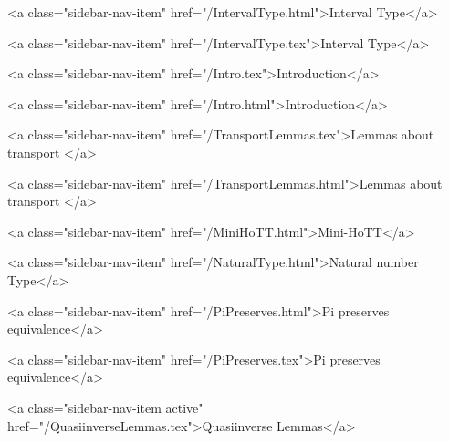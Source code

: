      
        
          <a class="sidebar-nav-item" href="/IntervalType.html">Interval Type</a>
        
      
    
      
        
          <a class="sidebar-nav-item" href="/IntervalType.tex">Interval Type</a>
        
      
    
      
        
          <a class="sidebar-nav-item" href="/Intro.tex">Introduction</a>
        
      
    
      
        
          <a class="sidebar-nav-item" href="/Intro.html">Introduction</a>
        
      
    
      
        
          <a class="sidebar-nav-item" href="/TransportLemmas.tex">Lemmas about transport </a>
        
      
    
      
        
          <a class="sidebar-nav-item" href="/TransportLemmas.html">Lemmas about transport </a>
        
      
    
      
        
          <a class="sidebar-nav-item" href="/MiniHoTT.html">Mini-HoTT</a>
        
      
    
      
        
          <a class="sidebar-nav-item" href="/NaturalType.html">Natural number Type</a>
        
      
    
      
        
          <a class="sidebar-nav-item" href="/PiPreserves.html">Pi preserves equivalence</a>
        
      
    
      
        
          <a class="sidebar-nav-item" href="/PiPreserves.tex">Pi preserves equivalence</a>
        
      
    
      
        
          <a class="sidebar-nav-item active" href="/QuasiinverseLemmas.tex">Quasiinverse Lemmas</a>
        
